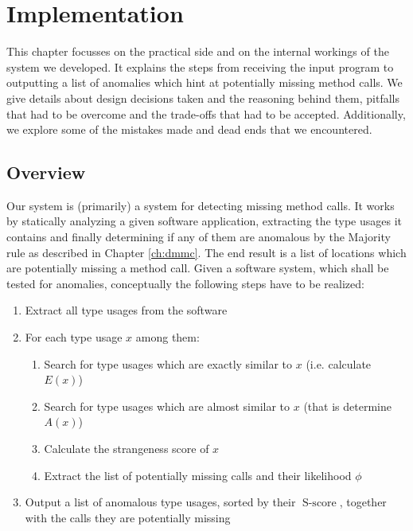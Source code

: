 \chapter{Implementation}\label{ch:impl}

This chapter focusses on the practical side and on the internal workings of the system we developed.
It explains the steps from receiving the input program to outputting a list of anomalies which hint at potentially missing method calls.
We give details about design decisions taken and the reasoning behind them, pitfalls that had to be overcome and the trade-offs that had to be accepted.
Additionally, we explore some of the mistakes made and dead ends that we encountered.

\section{Overview}

Our system is (primarily) a system for detecting missing method calls.
It works by statically analyzing a given software application, extracting the type usages it contains and finally determining if any of them are anomalous by the Majority rule as described in Chapter \ref{ch:dmmc}.
The end result is a list of locations which are potentially missing a method call.
Given a software system, which shall be tested for anomalies, conceptually the following steps have to be realized:

\begin{enumerate}
    \item Extract all type usages from the software
    \item For each type usage $x$ among them:
    \begin{enumerate}
        \item Search for type usages which are exactly similar to $x$ (i.e. calculate $E(x)$)
        \item Search for type usages which are almost similar to $x$ (that is determine $A(x)$)
        \item Calculate the strangeness score of $x$
        \item Extract the list of potentially missing calls and their likelihood $\phi$
    \end{enumerate}
    \item Output a list of anomalous type usages, sorted by their $\operatorname{S-score}$, together with the calls they are potentially missing
\end{enumerate}

